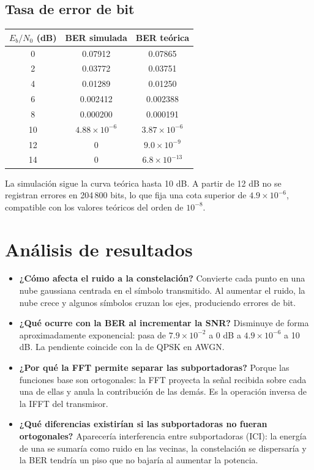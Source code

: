 \documentclass[11pt,a4paper]{article}
\begin{document}
\subsection{Tasa de error de bit}

\begin{tabular}{@{}ccc@{}}
  \toprule
  $E_b/N_0$ (dB) & BER simulada & BER teórica \\
  \midrule
  0  & 0.07912 & 0.07865 \\
  2  & 0.03772 & 0.03751 \\
  4  & 0.01289 & 0.01250 \\
  6  & 0.002412 & 0.002388 \\
  8  & 0.000200 & 0.000191 \\
  10 & $4.88\times10^{-6}$ & $3.87\times10^{-6}$ \\
  12 & 0 & $9.0\times10^{-9}$ \\
  14 & 0 & $6.8\times10^{-13}$ \\
  \bottomrule
\end{tabular}


La simulación sigue la curva teórica hasta 10 dB. A partir de 12 dB no se registran
errores en 204\,800 bits, lo que fija una cota superior de $4.9\times10^{-6}$, compatible
con los valores teóricos del orden de $10^{-8}$.

\section{Análisis de resultados}

\begin{itemize}
  \item \textbf{¿Cómo afecta el ruido a la constelación?} Convierte cada punto en una nube
        gaussiana centrada en el símbolo transmitido. Al aumentar el ruido, la nube crece y
        algunos símbolos cruzan los ejes, produciendo errores de bit.
  \item \textbf{¿Qué ocurre con la BER al incrementar la SNR?} Disminuye de forma
        aproximadamente exponencial: pasa de $7.9\times10^{-2}$ a 0 dB a
        $4.9\times10^{-6}$ a 10 dB. La pendiente coincide con la de QPSK en AWGN.
  \item \textbf{¿Por qué la FFT permite separar las subportadoras?} Porque las funciones
        base son ortogonales: la FFT proyecta la señal recibida sobre cada una de ellas y
        anula la contribución de las demás. Es la operación inversa de la IFFT del
        transmisor.
  \item \textbf{¿Qué diferencias existirían si las subportadoras no fueran ortogonales?}
        Aparecería interferencia entre subportadoras (ICI): la energía de una se sumaría
        como ruido en las vecinas, la constelación se dispersaría y la BER tendría un piso
        que no bajaría al aumentar la potencia.
\end{itemize}
\end{document}
